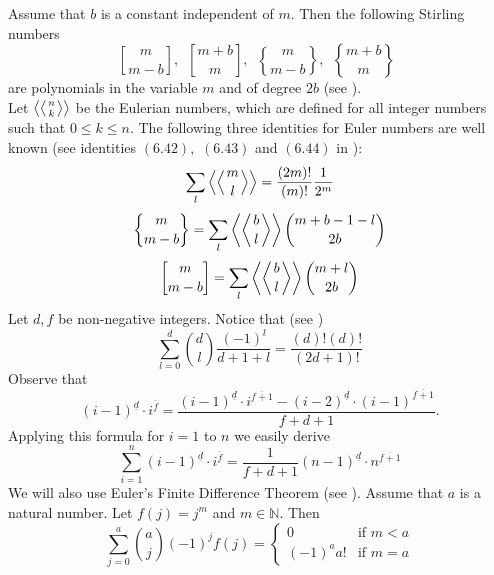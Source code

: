 \documentclass[final,5p,times,twocolumn]{elsarticle_mod}
\begin{document}
Assume that $b$ is a constant independent of $m.$ Then the following Stirling numbers
\begin{equation}
\label{eq:stirling_since} 
{ m\brack m-b},\,\,\,{ m+b\brack m},\,\,\,{ m\brace m-b},\,\,\,{ m+b\brace m}\,\,\,
\end{equation}
are polynomials in the variable $m$ and of degree $2b$ (see \cite{concrete_1994}).\\
Let $\left\langle\left\langle n\atop k\right\rangle\right\rangle$   be the Eulerian numbers, which are
defined for all integer numbers such that $0\le k \le n.$ 
The following three identities for Euler numbers are well known (see identities $(6.42),$ $(6.43)$ and $(6.44)$ in \cite{concrete_1994}):
\begin{equation}
\label{eq:euler1}
\sum_{l}\left\langle\left\langle m\atop l\right\rangle\right\rangle=\frac{(2m)!}{(m)!}\frac{1}{2^m}
\end{equation}
\begin{equation}
\label{eq:euler2}
{m\brace m-b}=\sum_{l}\left\langle\left\langle b\atop l\right\rangle\right\rangle\binom{m+b-1-l}{2b}
\end{equation}
\begin{equation}
\label{eq:euler3}
{m\brack m-b}=\sum_{l}\left\langle\left\langle b\atop l\right\rangle\right\rangle\binom{m+l}{2b}
\end{equation}
Let $d,f$ be non-negative integers. Notice that (see \cite[identity 5.41]{concrete_1994})
\begin{equation}
\label{eq:altalt}
\sum_{l=0}^{d}\binom{d}{l}\frac{(-1)^l}{d+1+l}=\frac{(d)!(d)!}{(2d+1)!}
\end{equation}
Observe that
$$(i-1)^{\underline{d}}\cdot i^{\overline{f}}=
\frac{(i-1)^{\underline{d}}\cdot i^{\overline{f+1}}- (i-2)^{\underline{d}}\cdot (i-1)^{\overline{f+1}}}{f+d+1}.$$
Applying this formula for $i=1$ to $n $ we easily derive
\begin{equation}
\label{eq:identity}
\sum_{i=1}^n(i-1)^{\underline{d}}\cdot i^{\overline{f}} =\frac{1}{f+d+1}(n-1)^{\underline{d}}\cdot n^{\overline{f+1}}
\end{equation}
We will also use Euler's Finite Difference Theorem (see \cite[identity 10.1]{Gould}).
Assume that $a$ is a natural number. Let $f(j)=j^m$ and $m\in \mathbb{N}.$  Then
\begin{equation}
\label{eq:triangle}
\sum_{j=0}^{a}\binom{a}{j}(-1)^jf(j)=\begin{cases} 0 &\mbox{if } m <a \\
(-1)^{a}a! & \mbox{if } m= a \end{cases}
\end{equation}
\end{document}
